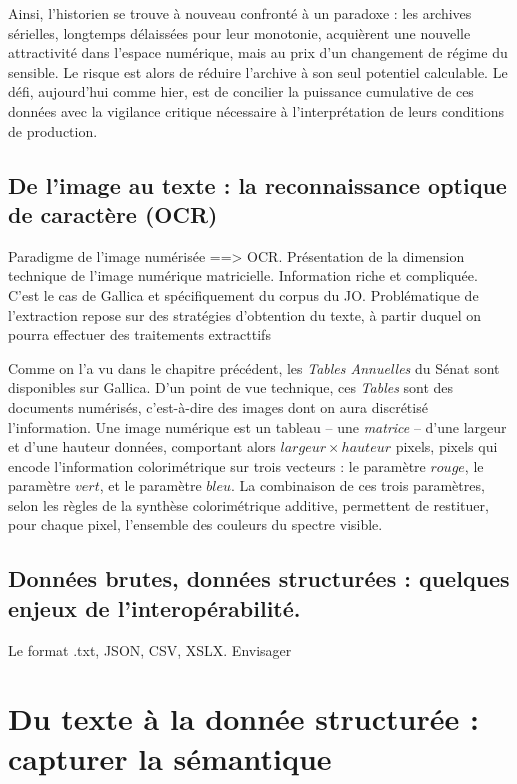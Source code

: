 Ainsi, l’historien se trouve à nouveau confronté à un paradoxe : les archives sérielles, longtemps délaissées pour leur monotonie, acquièrent une nouvelle attractivité dans l’espace numérique, mais au prix d’un changement de régime du sensible. Le risque est alors de réduire l’archive à son seul potentiel calculable. Le défi, aujourd’hui comme hier, est de concilier la puissance cumulative de ces données avec la vigilance critique nécessaire à l’interprétation de leurs conditions de production.

\section{De l'image au texte : la reconnaissance optique de caractère (OCR)}

Paradigme de l'image numérisée  ==> OCR. Présentation de la dimension technique de l'image numérique matricielle. Information riche et compliquée. C'est le cas de Gallica et spécifiquement du corpus du JO. Problématique de l'extraction repose sur des stratégies d'obtention du texte, à partir duquel on pourra effectuer des traitements extracttifs

Comme on l'a vu dans le chapitre précédent, les \emph{Tables Annuelles} du Sénat sont disponibles sur Gallica. D'un point de vue technique, ces \emph{Tables} sont des documents numérisés, c'est-à-dire des images dont on aura discrétisé l'information. Une image numérique est un tableau -- une \emph{matrice} -- d'une largeur et d'une hauteur données, comportant alors $largeur \times hauteur$ pixels, pixels qui encode l'information colorimétrique sur trois vecteurs : le paramètre $rouge$, le paramètre $vert$, et le paramètre $bleu$. La combinaison de ces trois paramètres, selon les règles de la synthèse colorimétrique additive, permettent de restituer, pour chaque pixel, l'ensemble des couleurs du spectre visible.

\section{Données brutes, données structurées : quelques enjeux de l'interopérabilité.}

Le format .txt, JSON, CSV, XSLX. Envisager

\chapter{Du texte à la donnée structurée : capturer la sémantique}

